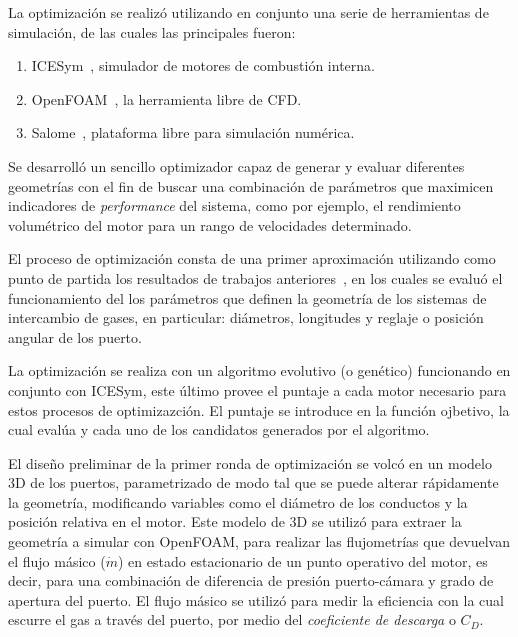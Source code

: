 La optimización se realizó utilizando en conjunto una serie de herramientas de
simulación, de las cuales las principales fueron:

\begin{enumerate}
    \item ICESym~\parencite{icesym}, simulador de motores de combustión interna.
    \item OpenFOAM~\parencite{openfoam}, la herramienta libre de CFD.
    \item Salome~\parencite{salome}, plataforma libre para simulación numérica.
\end{enumerate}

Se desarrolló un sencillo optimizador capaz de generar y evaluar diferentes
geometrías con el fin de buscar una combinación de parámetros que maximicen
indicadores de \emph{performance} del sistema, como por ejemplo, el rendimiento
volumétrico del motor para un rango de velocidades determinado.

El proceso de optimización consta de una primer aproximación utilizando como
punto de partida los resultados de trabajos anteriores~\parencite{lopez13}, en
los cuales se evaluó el funcionamiento del los parámetros que definen la
geometría de los sistemas de intercambio de gases, en particular: diámetros,
longitudes y reglaje o posición angular de los puerto.

La optimización se realiza con un algoritmo evolutivo (o genético) funcionando
en conjunto con ICESym, este último provee el puntaje a cada motor
necesario para estos procesos de optimizazción.
%
El puntaje se introduce en la función ojbetivo, la cual evalúa y cada uno de
los candidatos generados por el algoritmo.

El diseño preliminar de la primer ronda de optimización se volcó en un modelo
3D de los puertos, parametrizado de modo tal que se puede alterar rápidamente
la geometría, modificando variables como el diámetro de los conductos y la
posición relativa en el motor.
%
Este modelo de 3D se utilizó para extraer la geometría a simular con OpenFOAM,
para realizar las flujometrías que devuelvan el flujo másico ($\dot{m}$) en
estado estacionario de un punto operativo del motor, es decir, para una
combinación de diferencia de presión puerto-cámara y grado de apertura del
puerto.
%
El flujo másico se utilizó para medir la eficiencia con la cual escurre el gas
a través del puerto, por medio del \emph{coeficiente de descarga} o $C_D$.

